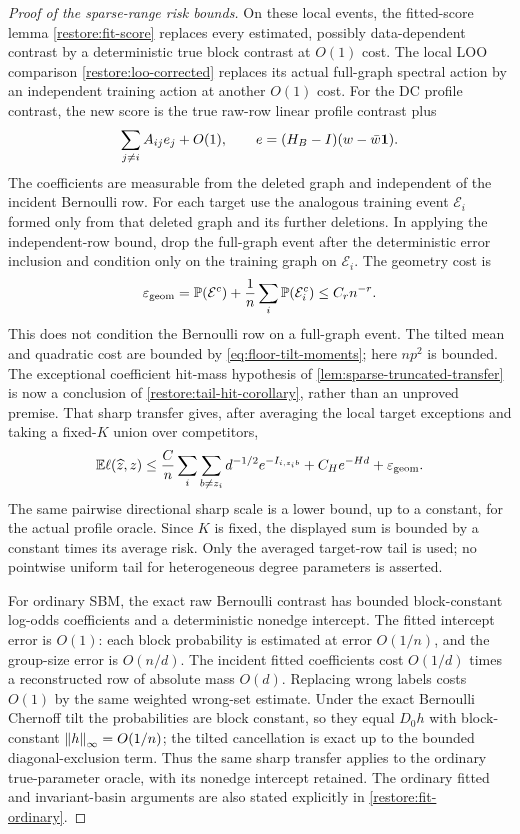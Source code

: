 \begin{proof}[Proof of the sparse-range risk bounds]
On these local events, the fitted-score lemma
\cref{restore:fit-score} replaces every estimated, possibly
data-dependent contrast by a deterministic true block contrast at
$O(1)$ cost. The local LOO comparison
\cref{restore:loo-corrected} replaces its actual full-graph spectral
action by an independent training action at another $O(1)$ cost.
For the DC profile contrast, the new score is the true raw-row
linear profile contrast plus
\[
 \sum_{j\ne i}A_{ij}e_j+O(1),\qquad
 e=(H_B-I)(w-\bar w\mathbf 1).
\]
The coefficients are measurable from the deleted graph and independent
of the incident Bernoulli row. For each target use the analogous
training event $\mathcal E_i$ formed only from that deleted graph and
its further deletions. In applying the independent-row bound,
drop the full-graph event after the deterministic error inclusion and
condition only on the training graph on $\mathcal E_i$.
The geometry cost is
\[
 \varepsilon_{\rm geom}
 =\mathbb P(\mathcal E^c)+\frac1n\sum_i\mathbb P(\mathcal E_i^c)
 \le C_rn^{-r}.
\]
This does not condition the Bernoulli row on a full-graph event.
The tilted mean and quadratic cost are
bounded by \eqref{eq:floor-tilt-moments}; here $np^2$ is bounded.
The exceptional coefficient hit-mass hypothesis of
\cref{lem:sparse-truncated-transfer} is now a conclusion of
\cref{restore:tail-hit-corollary}, rather than an unproved premise. That sharp
transfer gives, after averaging the local target exceptions and taking
a fixed-$K$ union over competitors,
\[
 \mathbb E\ell(\widehat z,z)
 \le \frac Cn\sum_i\sum_{b\ne z_i}
                  d^{-1/2}e^{-I_{i,z_i b}}
       +C_He^{-Hd}+\varepsilon_{\rm geom}.
\]
The same pairwise directional sharp scale is a lower bound, up to a
constant, for the actual profile oracle. Since $K$ is fixed, the
displayed sum is bounded by a constant times its average risk.
Only the averaged target-row tail is used; no pointwise uniform tail
for heterogeneous degree parameters is asserted.

For ordinary SBM, the exact raw Bernoulli contrast has bounded
block-constant log-odds coefficients and a deterministic nonedge
intercept. The fitted intercept error is $O(1)$: each block probability
is estimated at error $O(1/n)$, and the group-size error is $O(n/d)$.
The incident fitted coefficients cost $O(1/d)$ times a reconstructed
row of absolute mass $O(d)$. Replacing wrong labels costs $O(1)$ by
the same weighted wrong-set estimate. Under the exact Bernoulli
Chernoff tilt the probabilities are block constant, so they equal
$D_0h$ with block-constant $\left\lVert h\right\rVert_\infty=O(1/n)$; the tilted
cancellation is exact up to the bounded diagonal-exclusion term.
Thus the same sharp transfer applies to the ordinary true-parameter
oracle, with its nonedge intercept retained. The ordinary fitted and
invariant-basin arguments are also stated explicitly in
\cref{restore:fit-ordinary}.


\end{proof}
